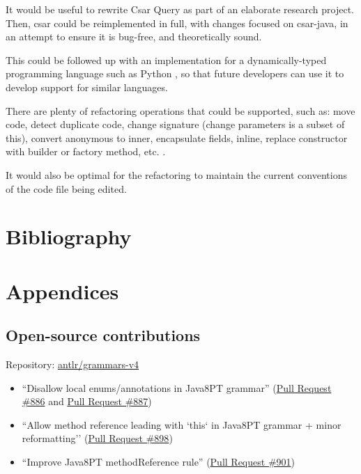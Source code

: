 \documentclass[12pt, letterpaper]{article}
\begin{document}
It would be useful to rewrite Csar Query as part of an elaborate research project.
Then, csar could be reimplemented in full, with changes focused on csar-java, in an attempt to ensure it is bug-free, and theoretically sound.

This could be followed up with an implementation for a dynamically-typed programming language such as Python \autocite{learningpython5thed}, so that future developers can use it to develop support for similar languages.

There are plenty of refactoring operations that could be supported, such as: move code, detect duplicate code, change signature (change parameters is a subset of this), convert anonymous to inner, encapsulate fields, inline, replace constructor with builder or factory method, etc. \autocite{intellijidearefactoring}.

It would also be optimal for the refactoring to maintain the current conventions of the code file being edited.

\section{Bibliography}
\printbibliography[heading=none]

\section{Appendices}

\subsection{Open-source contributions}
\label{apx:OpenSourceContributions}
Repository: \href{https://github.com/antlr/grammars-v4}{antlr/grammars-v4}
\begin{itemize}
  \item ``Disallow local enums/annotations in Java8PT grammar'' (\href{https://github.com/antlr/grammars-v4/pull/886}{Pull Request \#886} and \href{https://github.com/antlr/grammars-v4/pull/887}{Pull Request \#887})
  \item ``Allow method reference leading with `this` in Java8PT grammar + minor reformatting'' (\href{https://github.com/antlr/grammars-v4/pull/898}{Pull Request \#898})
  \item ``Improve Java8PT methodReference rule'' (\href{https://github.com/antlr/grammars-v4/pull/901}{Pull Request \#901})
\end{itemize}
\end{document}
